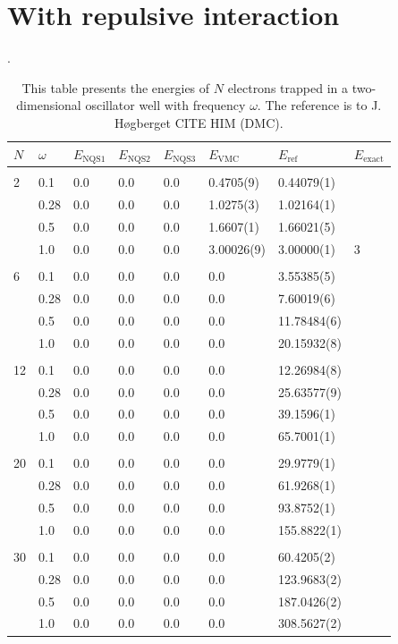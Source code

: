 \section{With repulsive interaction}
\begin{table} [H]
	\caption{This table presents the energies of $N$ electrons trapped in a two-dimensional oscillator well with frequency $\omega$. The reference is to J. Høgberget CITE HIM (DMC). }. 
	\begin{tabularx}{\textwidth}{l:l|XXXXXX} \hline\hline
		\label{tab:quantumdotswinteraction2D}
		$N$ & $\omega$ & $E_{\text{NQS1}}$ & $E_{\text{NQS2}}$ & $E_{\text{NQS3}}$ & $E_{\text{VMC}}$ & $E_{\text{ref}} $ & $E_{\text{exact}}$ \\ \hline \\
		2 & 0.1 & 0.0 & 0.0 & 0.0 & 0.4705(9) & 0.44079(1) & \\ 
		& 0.28 & 0.0 & 0.0 & 0.0 & 1.0275(3) & 1.02164(1) & \\
		& 0.5 & 0.0 & 0.0 & 0.0 & 1.6607(1) & 1.66021(5) &  \\
		& 1.0 & 0.0 & 0.0 & 0.0 & 3.00026(9) & 3.00000(1) & 3  \\ \hdashline \\
		
		6 & 0.1 & 0.0 & 0.0 & 0.0 & 0.0 & 3.55385(5) \\ 
		& 0.28 & 0.0 & 0.0 & 0.0 & 0.0 & 7.60019(6) \\
		& 0.5 & 0.0 & 0.0 & 0.0 & 0.0 & 11.78484(6) \\
		& 1.0 & 0.0 & 0.0 & 0.0 & 0.0 & 20.15932(8) \\ \hdashline \\
		
		12 & 0.1 & 0.0 & 0.0 & 0.0 & 0.0 & 12.26984(8) \\ 
		& 0.28 & 0.0 & 0.0 & 0.0 & 0.0 & 25.63577(9) \\
		& 0.5 & 0.0 & 0.0 & 0.0 & 0.0 & 39.1596(1) \\
		& 1.0 & 0.0 & 0.0 & 0.0 & 0.0 & 65.7001(1) \\ \hdashline \\
		
		20 & 0.1 & 0.0 & 0.0 & 0.0 & 0.0 & 29.9779(1) \\ 
		& 0.28 & 0.0 & 0.0 & 0.0 & 0.0 & 61.9268(1) \\
		& 0.5 & 0.0 & 0.0 & 0.0 & 0.0 & 93.8752(1) \\
		& 1.0 & 0.0 & 0.0 & 0.0 & 0.0 & 155.8822(1) \\ \hdashline \\
		
		30 & 0.1 & 0.0 & 0.0 & 0.0 & 0.0 & 60.4205(2)\\ 
		& 0.28 & 0.0 & 0.0 & 0.0 & 0.0 & 123.9683(2)\\
		& 0.5 & 0.0 & 0.0 & 0.0 & 0.0 & 187.0426(2)\\
		& 1.0 & 0.0 & 0.0 & 0.0 & 0.0 & 308.5627(2)\\ \hline\hline
	\end{tabularx}
\end{table}

